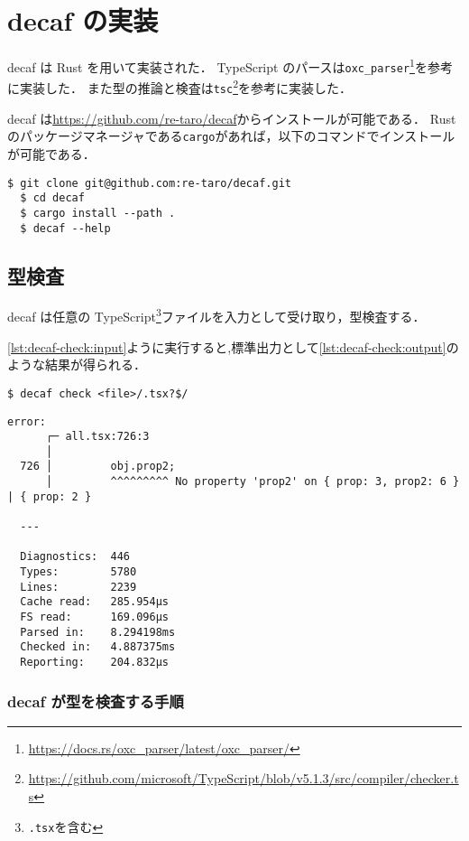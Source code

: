 \chapter{decaf の実装}

decaf は Rust を用いて実装された．
TypeScript のパースは\texttt{oxc\_parser}\footnote{\url{https://docs.rs/oxc_parser/latest/oxc_parser/}}を参考に実装した．
また型の推論と検査は\texttt{tsc}\footnote{\url{https://github.com/microsoft/TypeScript/blob/v5.1.3/src/compiler/checker.ts}}を参考に実装した．

decaf は\url{https://github.com/re-taro/decaf}からインストールが可能である．
Rust のパッケージマネージャである\texttt{cargo}があれば，以下のコマンドでインストールが可能である．

\begin{lstlisting}[caption=decaf のインストール]
  $ git clone git@github.com:re-taro/decaf.git
  $ cd decaf
  $ cargo install --path .
  $ decaf --help
\end{lstlisting}

\section{型検査}

decaf は任意の TypeScript\footnote{\texttt{.tsx}を含む}ファイルを入力として受け取り，型検査する．

\ref{lst:decaf-check:input}ように実行すると,標準出力として\ref{lst:decaf-check:output}のような結果が得られる．

\begin{lstlisting}[caption=decaf の型検査, label=lst:decaf-check:input]
  $ decaf check <file>/.tsx?$/
\end{lstlisting}

\begin{lstlisting}[caption=decaf の型検査結果, label=lst:decaf-check:output]
  error:
      ┌─ all.tsx:726:3
      │
  726 │         obj.prop2;
      │         ^^^^^^^^^ No property 'prop2' on { prop: 3, prop2: 6 } | { prop: 2 }

  ---

  Diagnostics:	446
  Types:      	5780
  Lines:      	2239
  Cache read: 	285.954µs
  FS read:    	169.096µs
  Parsed in:  	8.294198ms
  Checked in: 	4.887375ms
  Reporting:  	204.832µs
\end{lstlisting}

\subsection{decaf が型を検査する手順}
\label{sec:decaf-check}

